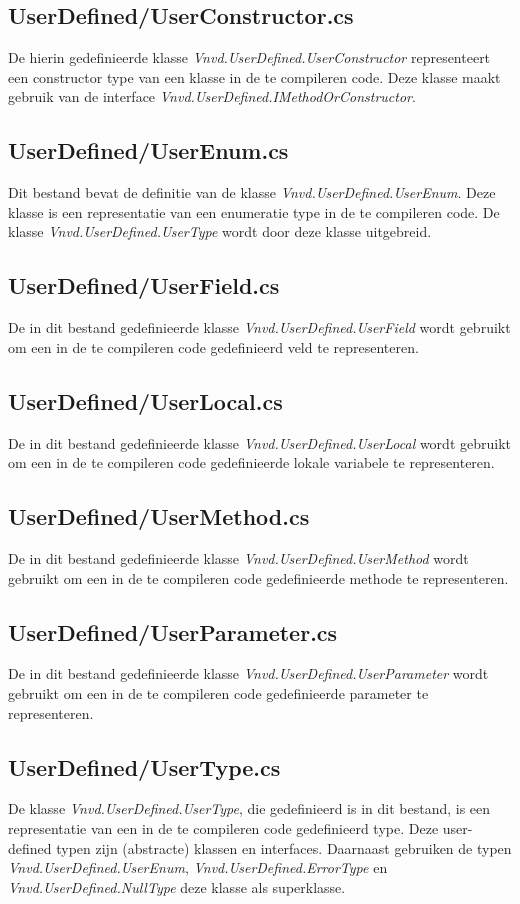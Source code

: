 \subsection{UserDefined/UserConstructor.cs}
De hierin gedefinieerde klasse \textit{Vnvd.UserDefined.UserConstructor} representeert een constructor type van een klasse in de te compileren code. Deze klasse maakt gebruik van de interface \textit{Vnvd.UserDefined.IMethodOrConstructor}.

\subsection{UserDefined/UserEnum.cs}
Dit bestand bevat de definitie van de klasse \textit{Vnvd.UserDefined.UserEnum}. Deze klasse is een representatie van een enumeratie type in de te compileren code. De klasse \textit{Vnvd.UserDefined.UserType} wordt door deze klasse uitgebreid.

\subsection{UserDefined/UserField.cs}
De in dit bestand gedefinieerde klasse \textit{Vnvd.UserDefined.UserField} wordt gebruikt om een in de te compileren code gedefinieerd veld te representeren.

\subsection{UserDefined/UserLocal.cs}
De in dit bestand gedefinieerde klasse \textit{Vnvd.UserDefined.UserLocal} wordt gebruikt om een in de te compileren code gedefinieerde lokale variabele te representeren.

\subsection{UserDefined/UserMethod.cs}
De in dit bestand gedefinieerde klasse \textit{Vnvd.UserDefined.UserMethod} wordt gebruikt om een in de te compileren code gedefinieerde methode te representeren.

\subsection{UserDefined/UserParameter.cs}
De in dit bestand gedefinieerde klasse \textit{Vnvd.UserDefined.UserParameter} wordt gebruikt om een in de te compileren code gedefinieerde parameter te representeren.

\subsection{UserDefined/UserType.cs}
De klasse \textit{Vnvd.UserDefined.UserType}, die gedefinieerd is in dit bestand, is een representatie van een in de te compileren code gedefinieerd type. Deze user-defined typen zijn (abstracte) klassen en interfaces. Daarnaast gebruiken de typen \textit{Vnvd.UserDefined.UserEnum}, \textit{Vnvd.UserDefined.ErrorType} en \textit{Vnvd.UserDefined.NullType} deze klasse als superklasse.
